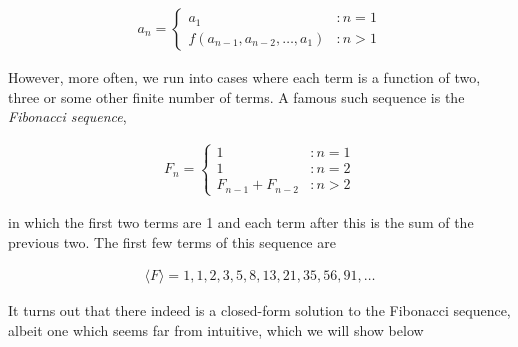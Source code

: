 \begin{align*}
	a_n =
	\begin{cases}
		a_1 &: n = 1 \\
		f(a_{n - 1}, a_{n - 2}, \dots, a_1) &: n > 1
	\end{cases}
\end{align*}

However, more often, we run into cases where each term is a function of two, three or some other finite number of terms. A famous such sequence is the \emph{Fibonacci sequence},

\begin{align*}
	F_n =
	\begin{cases}
		1 &: n = 1 \\
		1 &: n = 2 \\
		F_{n - 1} + F_{n - 2} &: n > 2
	\end{cases}
\end{align*}
 
in which the first two terms are 1 and each term after this is the sum of the previous two. The first few terms of this sequence are

\begin{align*}
	\langle F \rangle = 1, 1, 2, 3, 5, 8, 13, 21, 35, 56, 91, \dots
\end{align*}

It turns out that there indeed is a closed-form solution to the Fibonacci sequence, albeit one which seems far from intuitive, which we will show below 

